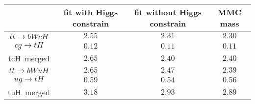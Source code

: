 
\centering
\begin{tabular}{cccc} \toprule\toprule
& fit with Higgs constrain  & fit without Higgs constrain & MMC mass\\\midrule
$\bar{t}t\to bWcH$ &    $2.55$  & $2.31$  & $2.30$       \\
$cg\to tH$ &            $0.12$  & $0.11$  & $0.11$       \\
tcH~merged &            $2.65$  & $2.40$  & $2.40$        \\
$\bar{t}t\to bWuH$ &    $2.65$  & $2.47$  & $2.39$         \\
$ug\to tH$ &            $0.59$  & $0.54$  & $0.56$         \\
tuH~merged &            $3.18$  & $2.93$  & $2.89$         \\
\bottomrule\bottomrule                  
\end{tabular}
